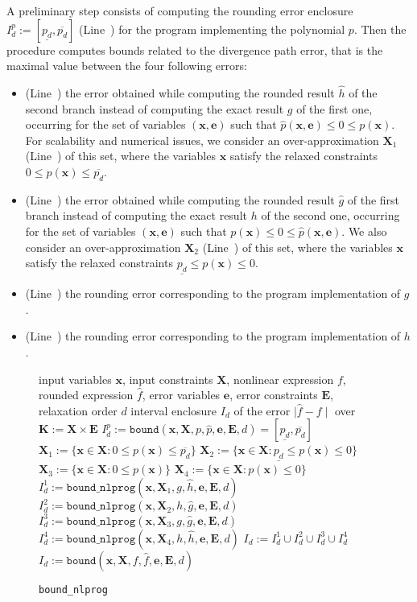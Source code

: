 \documentclass[preprint]{sigplanconf}
\newcommand{\code}[1]{\lstinline{#1}}
\newcommand{\x}{\mathbf{x}}
\newcommand{\e}{\mathbf{e}}
\def\E{\mathbf{E}}
\def\K{\mathbf{K}}
\def\X{\mathbf{X}}
\newcommand{\boundfun}[7]{\mathtt{bound}(#1, #2, #3, #4, #5, #6, #7)}
\newcommand{\boundnlprogfun}[7]{\mathtt{bound\_nlprog}(#1, #2, #3, #4, #5, #6, #7)}
\theoremstyle{plain}
\begin{document}
A preliminary step consists of computing the rounding error enclosure $I_d^p := [\underline{p_d}, \overline{p_d}]$ (Line~) for the program implementing the polynomial $p$. 
Then the procedure computes bounds related to the divergence path error, that is the maximal value between the four following errors: 
\begin{itemize}
\item (Line~) the error obtained while computing the rounded result $\hat{h}$ of the second branch instead of computing the exact result $g$ of the first one, occurring for the set of variables $(\x,\e)$ such that $\hat{p}(\x,\e) \leq 0 \leq p(\x)$. For scalability and numerical issues, we consider an over-approximation $\X_1$ (Line~) of this set, where the variables $\x$ satisfy the relaxed constraints $0 \leq p(\x) \leq \overline{p_d}$.
\item (Line~) the error obtained while computing the rounded result $\hat{g}$ of the first branch instead of computing the exact result $h$ of the second one, occurring for the set of variables $(\x,\e)$ such that $p(\x) \leq 0 \leq \hat{p}(\x,\e)$. We also consider an over-approximation $\X_2$ (Line~) of this set, where the variables $\x$ satisfy the relaxed constraints $\underline{p_d} \leq p(\x) \leq 0$.
\item (Line~) the rounding error corresponding to the program implementation of $g$.
\item(Line~) the rounding error corresponding to the program implementation of $h$.
\end{itemize}
%
\begin{figure}[!ht]
\begin{algorithmic}[1]
\Require input variables $\x$, input constraints $\X$, nonlinear expression $f$, rounded expression $\hat{f}$, error variables $\e$, error constraints $\E$, relaxation order $d$
\Ensure interval enclosure $I_d$ of the error $\mid \hat{f} - f  \mid$ over $\K := \X \times \E$
%
 \label{line:cnd}
\State $I_d^p := \boundfun{\x}{\X}{p}{\hat{p}}{\e}{\E}{d} = [\underline{p_d}, \overline{p_d}]$ \label{line:polcnd}
\State $\X_1 := \{ \x \in \X : 0 \leq p(\x) \leq \overline{p_d} \}$ \label{line:X1}
\State $\X_2 := \{ \x \in \X : \underline{p_d} \leq p(\x) \leq 0 \}$\label{line:X2}
\State $\X_3 := \{ \x \in \X : 0 \leq p(\x) \}$\label{line:X3}
\State $\X_4 := \{ \x \in \X : p(\x) \leq 0 \}$\label{line:X4}
\State $I_d^1 := \boundnlprogfun{\x}{\X_1}{g}{\hat{h}}{\e}{\E}{d}$\label{line:I1}
\State $I_d^2 := \boundnlprogfun{\x}{\X_2}{h}{\hat{g}}{\e}{\E}{d}$\label{line:I2}
\State $I_d^3 := \boundnlprogfun{\x}{\X_3}{g}{\hat{g}}{\e}{\E}{d}$\label{line:I3}
\State $I_d^4 := \boundnlprogfun{\x}{\X_4}{h}{\hat{h}}{\e}{\E}{d}$\label{line:I4}
\State \Return $I_d := I_d^1 \cup I_d^2 \cup I_d^3 \cup I_d^4$ \label{line:endcnd}
\Else \State \Return $I_d := \boundfun{\x}{\X}{f}{\hat{f}}{\e}{\E}{d}$ \label{line:noncnd}
\EndIf
%
\end{algorithmic}
\caption{\code{bound_nlprog}}
\label{alg:bound_nlprog}
\end{figure}
%
\end{document}
